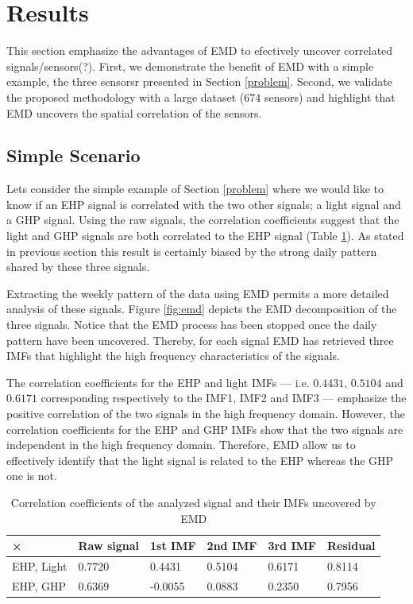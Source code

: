 \section{Results}
This section emphasize the advantages of EMD to efectively uncover correlated signals/sensors(?).
First, we demonstrate the benefit of EMD with a simple example, the three sensorsr presented in Section \ref{problem}.
Second, we validate the proposed methodology with a large dataset (674 sensors) and highlight that EMD uncovers the spatial correlation of the sensors.

\subsection{Simple Scenario}
Lets consider the simple example of Section \ref{problem} where we would like to know if an EHP signal is correlated with the two other signals; a light signal and a GHP signal.
Using the raw signals, the correlation coefficients suggest that the light and GHP signals are both correlated to the EHP signal (Table \ref{tab:corr}).
As stated in previous section this result is certainly biased by the strong daily pattern shared by these three signals.

Extracting the weekly pattern of the data using EMD permits a more detailed analysis of these signals.
Figure \ref{fig:emd} depicts the EMD decomposition of the three signals.
Notice that the EMD process has been stopped once the daily pattern have been uncovered.
Thereby, for each signal EMD has retrieved three IMFs that highlight the high frequency characteristics of the signals.

The correlation coefficients for the EHP and light IMFs --- i.e. $0.4431$, $0.5104$ and $0.6171$ corresponding respectively to the IMF1, IMF2 and IMF3 --- emphasize the positive correlation of the two signals in the high frequency domain.
However, the correlation coefficients for the EHP and GHP IMFs show that the two signals are independent in the high frequency domain.
Therefore, EMD allow us to effectively identify that the light signal is related to the EHP whereas the GHP one is not.


\begin{table}
\begin{center}
\begin{tabular}{|l|l|l|l|l|l|}
\hline
× & Raw signal & 1st IMF & 2nd IMF & 3rd IMF & Residual\\ \hline
EHP, Light & 0.7720 & 0.4431 & 0.5104 & 0.6171 & 0.8114\\ \hline
EHP, GHP & 0.6369 & -0.0055 & 0.0883 & 0.2350 & 0.7956\\ \hline
\end{tabular}
\caption{Correlation coefficients of the analyzed signal and their IMFs uncovered by EMD}
\label{tab:corr}
\end{center}
\end{table}


